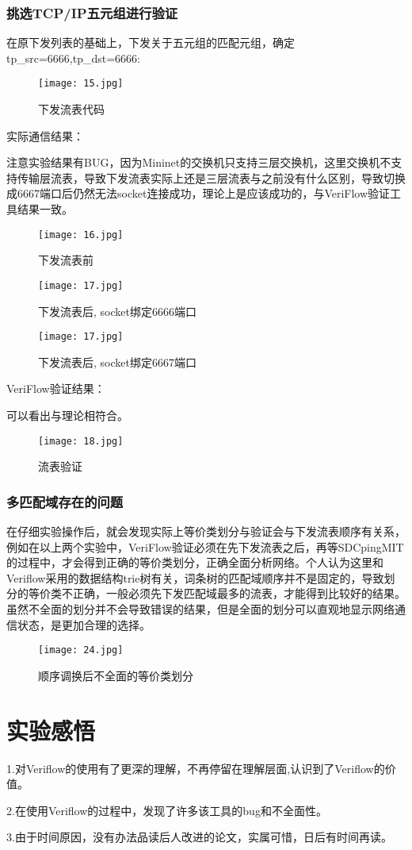 \documentclass{xjtureport}
\begin{document}
\subsubsection{挑选TCP/IP五元组进行验证}
在原下发列表的基础上，下发关于五元组的匹配元组，确定tp\_src=6666,tp\_dst=6666:
\begin{figure}[H]
	\centering
	\texttt{[image: 15.jpg]}
	\caption{下发流表代码}
\end{figure}
实际通信结果：\par
注意实验结果有BUG，因为Mininet的交换机只支持三层交换机，这里交换机不支持传输层流表，导致下发流表实际上还是三层流表与之前没有什么区别，导致切换成6667端口后仍然无法socket连接成功，理论上是应该成功的，与VeriFlow验证工具结果一致。
\begin{figure}[H]
	\centering
	\texttt{[image: 16.jpg]}
	\caption{下发流表前}
\end{figure}
\begin{figure}[H]
	\centering
	\texttt{[image: 17.jpg]}
	\caption{下发流表后, socket绑定6666端口}
\end{figure}
\begin{figure}[H]
	\centering
	\texttt{[image: 17.jpg]}
	\caption{下发流表后, socket绑定6667端口}
\end{figure}
VeriFlow验证结果：\par
可以看出与理论相符合。
\begin{figure}[H]
	\centering
	\texttt{[image: 18.jpg]}
	\caption{流表验证}
\end{figure}
\subsubsection{多匹配域存在的问题}
在仔细实验操作后，就会发现实际上等价类划分与验证会与下发流表顺序有关系，例如在以上两个实验中，VeriFlow验证必须在先下发流表之后，再等SDCpingMIT的过程中，才会得到正确的等价类划分，正确全面分析网络。个人认为这里和Veriflow采用的数据结构trie树有关，词条树的匹配域顺序并不是固定的，导致划分的等价类不正确，一般必须先下发匹配域最多的流表，才能得到比较好的结果。虽然不全面的划分并不会导致错误的结果，但是全面的划分可以直观地显示网络通信状态，是更加合理的选择。
\begin{figure}[H]
	\centering
	\texttt{[image: 24.jpg]}
	\caption{顺序调换后不全面的等价类划分}
\end{figure}
\section{实验感悟}
1.对Veriflow的使用有了更深的理解，不再停留在理解层面,认识到了Veriflow的价值。\par 
2.在使用Veriflow的过程中，发现了许多该工具的bug和不全面性。\par 
3.由于时间原因，没有办法品读后人改进的论文，实属可惜，日后有时间再读。\par
\end{document}
